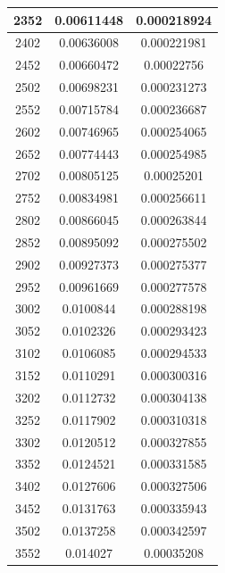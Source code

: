 \documentclass{article}
\begin{document}
\begin{longtable}{|c|c|c|}
		2352	&  0.00611448 	 &  0.000218924  \\ \hline                  
		2402	&  0.00636008 	 &  0.000221981  \\ \hline                  
		2452	&  0.00660472 	 &  0.00022756   \\ \hline                 
		2502	&  0.00698231 	 &  0.000231273  \\ \hline                  
		2552	&  0.00715784 	 &  0.000236687  \\ \hline                  
		2602	&  0.00746965 	 &  0.000254065  \\ \hline                  
		2652	&  0.00774443 	 &  0.000254985  \\ \hline                  
		2702	&  0.00805125 	 &  0.00025201   \\ \hline                 
		2752	&  0.00834981 	 &  0.000256611  \\ \hline                  
		2802	&  0.00866045 	 &  0.000263844  \\ \hline                  
		2852	&  0.00895092 	 &  0.000275502  \\ \hline                  
		2902	&  0.00927373 	 &  0.000275377  \\ \hline                  
		2952	&  0.00961669 	 &  0.000277578  \\ \hline                  
		3002	&  0.0100844  	 &  0.000288198  \\ \hline                  
		3052	&  0.0102326  	 &  0.000293423  \\ \hline                  
		3102	&  0.0106085  	 &  0.000294533  \\ \hline                  
		3152	&  0.0110291  	 &  0.000300316  \\ \hline                  
		3202	&  0.0112732  	 &  0.000304138  \\ \hline                  
		3252	&  0.0117902  	 &  0.000310318  \\ \hline                  
		3302	&  0.0120512  	 &  0.000327855  \\ \hline                  
		3352	&  0.0124521  	 &  0.000331585  \\ \hline                  
		3402	&  0.0127606  	 &  0.000327506  \\ \hline                  
		3452	&  0.0131763  	 &  0.000335943  \\ \hline                  
		3502	&  0.0137258  	 &  0.000342597  \\ \hline                  
		3552	&  0.014027   	 &  0.00035208   \\ \hline                 

\end{longtable}
\end{document}
